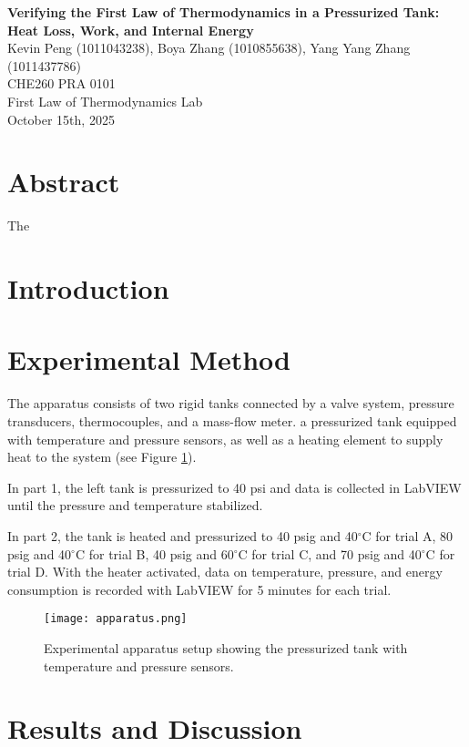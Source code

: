 \documentclass[12pt]{article}
\begin{document}
\begin{center}
\textbf{\Large Verifying the First Law of Thermodynamics in a Pressurized Tank: Heat Loss, Work, and Internal Energy} \\[0.5em]
Kevin Peng (1011043238), Boya Zhang (1010855638), Yang Yang Zhang (1011437786)\\[0.5em]
CHE260 PRA 0101 \\
First Law of Thermodynamics Lab \\
October 15th, 2025 \\
\end{center}

\section*{Abstract}
The 

\section{Introduction}

\section{Experimental Method}
The apparatus consists of two rigid tanks connected by a valve system, pressure transducers, thermocouples, and a mass-flow meter.
a pressurized tank equipped with temperature and pressure sensors, as well as a heating element to supply heat to the system (see Figure \ref{fig:apparatus}).

In part 1, the left tank is pressurized to 40 psi and data is collected in LabVIEW until the pressure and temperature stabilized.

In part 2, the tank is heated and pressurized to 40 psig and 40$^{\circ}$C for trial A, 80 psig and 40$^{\circ}$C for trial B, 40 psig and 60$^{\circ}$C for trial C, and 70 psig and 40$^{\circ}$C for trial D. With the heater activated, data on temperature, pressure, and energy consumption is recorded with LabVIEW for 5 minutes for each trial.

\begin{figure}[H]
    \centering
    \texttt{[image: apparatus.png]}
    \caption{Experimental apparatus setup showing the pressurized tank with temperature and pressure sensors.}
    \label{fig:apparatus}
\end{figure}


\section{Results and Discussion}
\end{document}
